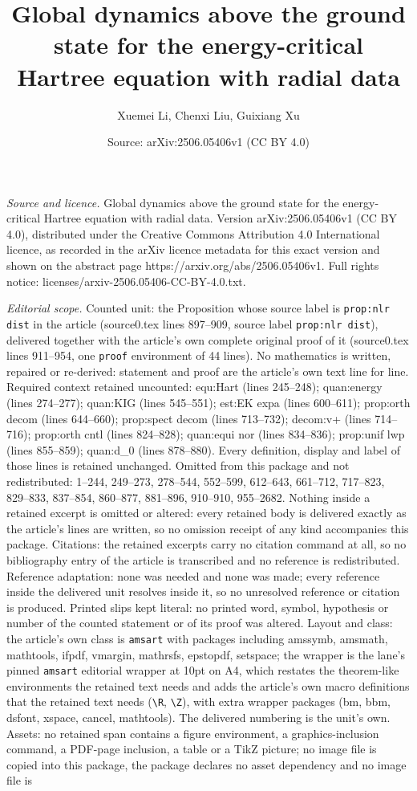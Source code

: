 \documentclass[10pt,a4paper]{amsart}
\title[Global dynamics above the ground state for the energy-critic]{Global dynamics above the ground state for the energy-critical Hartree equation with radial data}
\author{Xuemei Li, Chenxi Liu, Guixiang Xu}
\date{Source: arXiv:2506.05406v1 (CC BY 4.0)}
\begin{document}
\maketitle

\noindent\emph{Source and licence.} Global dynamics above the ground state for the energy-critical Hartree equation with radial data. Version arXiv:2506.05406v1 (CC BY 4.0), distributed under the Creative Commons Attribution 4.0 International licence, as recorded in the arXiv licence metadata for this exact version and shown on the abstract page https://arxiv.org/abs/2506.05406v1. Full rights notice: licenses/arxiv-2506.05406-CC-BY-4.0.txt.\par\smallskip

\noindent\textit{Editorial scope.} Counted unit: the Proposition whose source label is \texttt{prop:nlr dist} in the article (source0.tex lines 897--909, source label \texttt{prop:nlr dist}), delivered together with the article's own complete original proof of it (source0.tex lines 911--954, one \texttt{proof} environment of 44 lines). No mathematics is written, repaired or re-derived: statement and proof are the article's own text line for line. Required context retained uncounted: equ:Hart (lines 245--248); quan:energy (lines 274--277); quan:KIG (lines 545--551); est:EK expa (lines 600--611); prop:orth decom (lines 644--660); prop:spect decom (lines 713--732); decom:v+ (lines 714--716); prop:orth cntl (lines 824--828); quan:equi nor (lines 834--836); prop:unif lwp (lines 855--859); quan:d\_0 (lines 878--880). Every definition, display and label of those lines is retained unchanged. Omitted from this package and not redistributed: 1--244, 249--273, 278--544, 552--599, 612--643, 661--712, 717--823, 829--833, 837--854, 860--877, 881--896, 910--910, 955--2682. Nothing inside a retained excerpt is omitted or altered: every retained body is delivered exactly as the article's lines are written, so no omission receipt of any kind accompanies this package. Citations: the retained excerpts carry no citation command at all, so no bibliography entry of the article is transcribed and no reference is redistributed. Reference adaptation: none was needed and none was made; every reference inside the delivered unit resolves inside it, so no unresolved reference or citation is produced. Printed slips kept literal: no printed word, symbol, hypothesis or number of the counted statement or of its proof was altered. Layout and class: the article's own class is \texttt{amsart} with packages including amssymb, amsmath, mathtools, ifpdf, vmargin, mathrsfs, epstopdf, setspace; the wrapper is the lane's pinned \texttt{amsart} editorial wrapper at 10pt on A4, which restates the theorem-like environments the retained text needs and adds the article's own macro definitions that the retained text needs (\texttt{\textbackslash R}, \texttt{\textbackslash Z}), with extra wrapper packages (bm, bbm, dsfont, xspace, cancel, mathtools). The delivered numbering is the unit's own. Assets: no retained span contains a figure environment, a graphics-inclusion command, a PDF-page inclusion, a table or a TikZ picture; no image file is copied into this package, the package declares no asset dependency and no image file is 
\end{document}

